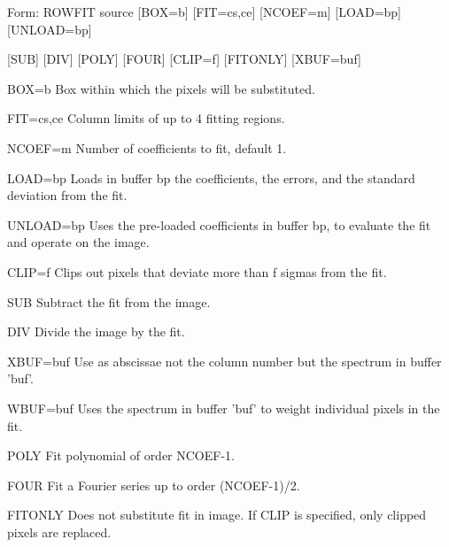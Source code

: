{\newpage\clearpage
{}%
\begin{command}
  \item[Form: ROWFIT source {[BOX=b]} {[FIT=cs,ce]} {[NCOEF=m]} {[LOAD=bp]} 
       {[UNLOAD=bp]}\hfill]{}
  \item{{[SUB]} {[DIV]} {[POLY]} {[FOUR]} {[CLIP=f]} {[FITONLY]} {[XBUF=buf]}}
  \item[BOX=b]{Box within which the pixels will be substituted.}
  \item[FIT=cs,ce]{Column limits of up to 4 fitting regions.}
  \item[NCOEF=m]{Number of coefficients to fit, default 1.}
  \item[LOAD=bp]{Loads in buffer bp the coefficients, the errors,
       and the standard deviation from the fit.}
  \item[UNLOAD=bp]{Uses the pre-loaded coefficients in buffer bp,  
       to evaluate the fit and operate on the image.}
  \item[CLIP=f]{Clips out pixels that deviate more than f sigmas from
       the fit.}
  \item[SUB]{Subtract the fit from the image.}
  \item[DIV]{Divide the image by the fit.}
  \item[XBUF=buf]{Use as abscissae not the column number but the spectrum  
       in buffer 'buf'.}
  \item[WBUF=buf]{Uses the spectrum in buffer 'buf' to weight individual
   pixels in the fit.}
  \item[POLY]{Fit polynomial of order NCOEF-1.}
  \item[FOUR]{Fit a Fourier series up to order (NCOEF-1)/2.}
  \item[FITONLY]{Does not substitute fit in image. If CLIP is specified,
       only clipped pixels are replaced.}
\end{command}%
\lthtmlfigureZ
\lthtmlcheckvsize\clearpage}

